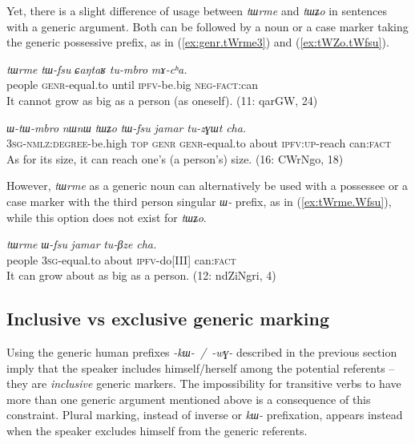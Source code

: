 \documentclass[oneside,a4paper,11pt]{article}
\newcommand{\ipa}[1]{\textit{\phon\mbox{#1}}} %
\newcommand{\refb}[1]{(\ref{#1})}
\begin{document}
Yet, there is a slight difference of usage between \ipa{tɯrme} and \ipa{tɯʑo} in sentences with a generic argument. Both can be followed by a noun or a case marker taking the generic possessive prefix, as in \refb{ex:genr.tWrme3} and \refb{ex:tWZo.tWfsu}. 

\begin{exe}
\ex  \label{ex:genr.tWrme3}
\gll
\ipa{tɯrme} 	\ipa{tɯ-fsu} 	\ipa{ɕaŋtaʁ} 	\ipa{tu-mbro} 	\ipa{mɤ-cʰa.} \\
people \textsc{genr}-equal.to until \textsc{ipfv}-be.big \textsc{neg-fact}:can \\ 
\glt It cannot grow as big as a person (as oneself). (11: qarGW, 24)
\end{exe}

\begin{exe}
\ex  \label{ex:tWZo.tWfsu}
\gll
\ipa{ɯ-tɯ-mbro} 	\ipa{nɯnɯ} 	\ipa{tɯʑo} 	\ipa{tɯ-fsu} 	\ipa{jamar} 	\ipa{tu-zɣɯt} 	\ipa{cha.}  \\
\textsc{3sg-nmlz:degree}-be.high \textsc{top} \textsc{genr} \textsc{genr}-equal.to about \textsc{ipfv:up}-reach can:\textsc{fact} \\
\glt As for its size, it can reach one's (a person's) size. (16: CWrNgo, 18)
\end{exe}

However, \ipa{tɯrme} as a generic noun can alternatively be used with a possessee or a case marker with the third person singular \ipa{ɯ-} prefix, as in \refb{ex:tWrme.Wfsu}, while this option does not exist for \ipa{tɯʑo}.

\begin{exe}
\ex  \label{ex:tWrme.Wfsu}
\gll
 	\ipa{tɯrme} 	\ipa{ɯ-fsu} 	\ipa{jamar} 	\ipa{tu-βze} 	\ipa{cha.} \\
people \textsc{3sg}-equal.to about \textsc{ipfv}-do[III] can:\textsc{fact} \\
\glt It can grow about as big as a person. (12: ndZiNgri, 4)
\end{exe}


\subsection{Inclusive vs exclusive generic marking} \label{sec:exclusive}
Using the generic human prefixes \ipa{-kɯ- / -wɣ-} described in the previous section imply that the speaker includes himself/herself among the potential referents -- they are \textit{inclusive} generic markers. The impossibility for transitive verbs to have more than one generic argument mentioned above is a consequence of this constraint. Plural marking, instead of inverse or \ipa{kɯ-} prefixation, appears instead when the speaker excludes himself from the generic referents.  
\end{document}
